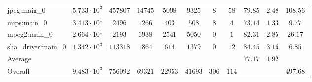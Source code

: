 \begin{tabular}{|l|c|c|c|c|c|c|c|c|c|c|}
jpeg:main\_0            & $ 5.733 \cdot 10^{3} $ & $ 457807 $ & $ 14745 $ & $ 5098  $ & $ 9325  $ & $ 8   $ & $ 58  $ & $ 79.85       $ & $ 2.48    $ & $ 108.56  $ \\
mips:main\_0            & $ 3.413 \cdot 10^{1} $ & $ 2496   $ & $ 1266  $ & $ 403   $ & $ 508   $ & $ 8   $ & $ 4   $ & $ 73.14       $ & $ 1.33    $ & $ 9.77    $ \\
mpeg2:main\_0           & $ 2.664 \cdot 10^{1} $ & $ 2193   $ & $ 6938  $ & $ 2541  $ & $ 5050  $ & $ 0   $ & $ 1   $ & $ 82.31       $ & $ 2.85    $ & $ 26.17   $ \\
sha\_driver:main\_0     & $ 1.342 \cdot 10^{3} $ & $ 113318 $ & $ 1864  $ & $ 614   $ & $ 1379  $ & $ 0   $ & $ 12  $ & $ 84.45       $ & $ 3.16    $ & $ 6.85    $ \\
\hline
Average                 & $                    $ & $        $ & $       $ & $       $ & $       $ & $     $ & $     $ & $ 77.17       $ & $ 1.92    $ & $         $ \\
\hline
Overall                 & $ 9.483 \cdot 10^{3} $ & $ 756092 $ & $ 69321 $ & $ 22953 $ & $ 41693 $ & $ 306 $ & $ 114 $ & $             $ & $         $ & $ 497.68  $ \\
\hline
\end{tabular}
